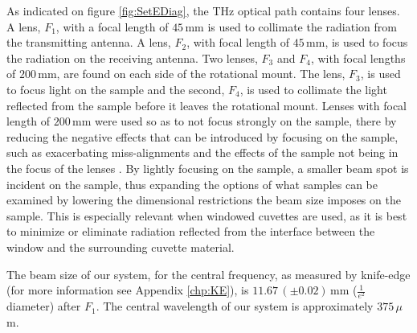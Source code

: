 As indicated on figure \ref{fig:SetEDiag}, the THz optical path contains four lenses. A lens, $F_{1}$, with a focal length of $45\,$mm is used to collimate the radiation from the transmitting antenna. A lens, $F_{2}$, with focal length of $45\,$mm, is used to focus the radiation on the receiving antenna. Two lenses, $F_{3}$ and $F_{4}$, with focal lengths of $200\,$mm, are found on each side of the rotational mount. The lens, $F_{3}$, is used to focus light on the sample and the second, $F_{4}$, is used to collimate the light reflected from the sample before it leaves the rotational mount. Lenses with focal length of $200\,$mm were used so as to not focus strongly on the sample, there by reducing the negative effects that can be introduced by focusing on the sample, such as exacerbating miss-alignments and the effects of the sample not being in the focus of the lenses \cite{Neshat2013}. 
By lightly focusing on the sample, a smaller beam spot is incident on the sample, thus expanding the options of what samples can be examined by lowering the dimensional restrictions the beam size imposes on the sample. This is especially relevant when windowed cuvettes are used, as it is best to minimize or eliminate radiation reflected from the interface between the window and the surrounding cuvette material.



The beam size of our system, for the central frequency, as measured by knife-edge (for more information see Appendix \ref{chp:KE}), is $11.67\,(\pm 0.02)\,$mm ($\frac{1}{e^{2}}$ diameter) after $F_{1}$. The central wavelength of our system is approximately $375\,\mu$m.


